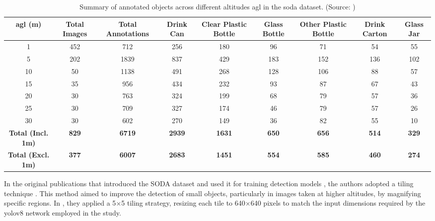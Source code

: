 \begin{table}[ht]
    \centering
    \begin{adjustbox}{max width=\textwidth}
    \renewcommand{\arraystretch}{2}%
    \begin{tabular}{|c|c|c|c|c|c|c|c|c|}
        \hline
        \textbf{\gls{agl} (m)} & \textbf{Total Images} & \textbf{Total Annotations} & \textbf{Drink Can} & \textbf{Clear Plastic Bottle} & \textbf{Glass Bottle} & \textbf{Other Plastic Bottle} & \textbf{Drink Carton} & \textbf{Glass Jar} \\
        \hline \hline
        1  & 452 & 712  & 256 & 180 & 96  & 71  & 54  & 55 \\
        \hline
        5  & 202 & 1839 & 837 & 429 & 183 & 152 & 136 & 102 \\
        \hline
        10 & 50  & 1138 & 491 & 268 & 128 & 106 & 88  & 57 \\
        \hline
        15 & 35  & 956  & 434 & 232 & 93  & 87  & 67  & 43 \\
        \hline
        20 & 30  & 763  & 324 & 199 & 68  & 79  & 57  & 36 \\
        \hline
        25 & 30  & 709  & 327 & 174 & 46  & 79  & 57  & 26 \\
        \hline
        30 & 30  & 602  & 270 & 149 & 36  & 82  & 55  & 10 \\
        \hline \hline
        \textbf{Total (Incl. 1m)} & \textbf{829} & \textbf{6719} & \textbf{2939} & \textbf{1631} & \textbf{650} & \textbf{656} & \textbf{514} & \textbf{329} \\
        \hline
        \textbf{Total (Excl. 1m)} & \textbf{377} & \textbf{6007} & \textbf{2683} & \textbf{1451} & \textbf{554} & \textbf{585} & \textbf{460} & \textbf{274} \\
        \hline
    \end{tabular}
    \renewcommand{\arraystretch}{1}%
    \end{adjustbox}
    \caption{Summary of annotated objects across different altitudes \gls{agl} in the \gls{soda} dataset. (Source: \cite{soda_dataset})}
    \label{tab:soda_annotation_summary}
\end{table}

In the original publications that introduced the SODA dataset and used it for training detection models \cite{soda_dataset, detect_litter}, the authors adopted a tiling technique \cite{tiling, sahi_detection}. This method aimed to improve the detection of small objects, particularly in images taken at higher altitudes, by magnifying specific regions. In \cite{detect_litter}, they applied a 5$\times$5 tiling strategy, resizing each tile to 640$\times$640 pixels to match the input dimensions required by the \gls{yolo}v8 \cite{yolov8} network employed in the study.

